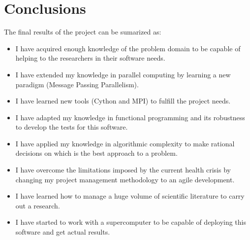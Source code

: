 \documentclass{tfg_domingo}
\begin{document}
\chapter{Conclusions}

  The final results of the project can be sumarized as:
  \begin{itemize}
    \item I have acquired enough knowledge of the problem domain
    to be capable of helping to the researchers in their software needs.
    \item I have extended my knowledge in parallel computing by learning a
    new paradigm (Message Passing Parallelism).
    \item I have learned new tools (Cython and MPI) to fulfill the
    project needs.
    \item I have adapted my knowledge in functional programming and its
    robustness to develop the tests for this software.
    \item I have applied my knowledge in algorithmic complexity to make
    rational decisions on which is the best approach to a problem.
    \item I have overcome the limitations imposed by the current health crisis
    by changing my project management methodology to an agile development.
    \item I have learned how to manage a huge volume of scientific literature
    to carry out a research.
    \item I have started to work with a supercomputer to be capable of
    deploying this software and get actual results.
  \end{itemize}
\end{document}

